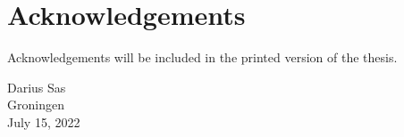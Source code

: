 \chapter*{Acknowledgements}
Acknowledgements will be included in the printed version of the thesis.
\begin{flushright}
Darius Sas\\
Groningen\\
July 15, 2022 %
\end{flushright}





